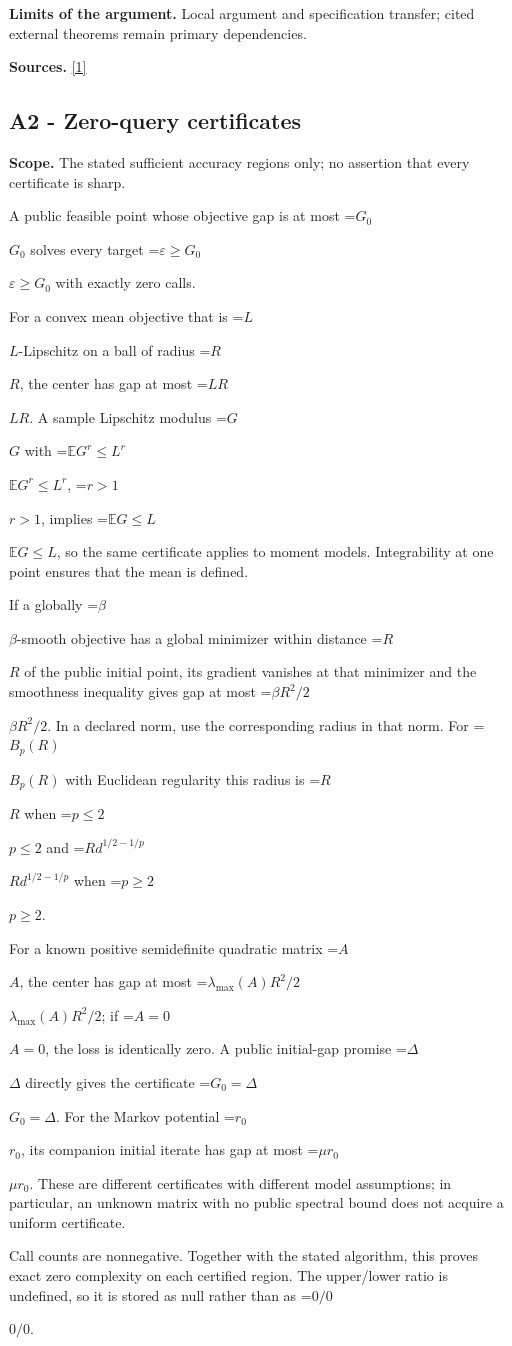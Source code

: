 \documentclass[10pt,a4paper]{article}
\newcommand{\AtlasMath}[1]{\par\begingroup\centering\setbox0=\hbox{$\displaystyle #1$}\ifdim\wd0>1.4\linewidth\typeout{ATLAS WIDE FORMULA: \the\wd0}\fi\ifdim\wd0>\linewidth\resizebox{\linewidth}{!}{\box0}\else\box0\fi\par\endgroup}
\newcommand{\AtlasInlineMath}[1]{\begingroup\setbox0=\hbox{$#1$}\ifdim\wd0>.4\linewidth\endgroup\AtlasMath{#1}\else\endgroup$#1$\fi}
\begin{document}
\textbf{Limits of the argument.} Local argument and specification transfer; cited external theorems remain primary dependencies.

\textbf{Sources.} \href{https://proceedings.mlr.press/v306/prokhorov26a.html}{[1]}

\subsection{A2 - Zero-query certificates}
\textbf{Scope.} The stated sufficient accuracy regions only; no assertion that every certificate is sharp.

A public feasible point whose objective gap is at most \AtlasInlineMath{G_0} solves every target \AtlasInlineMath{\varepsilon\ge G_0} with exactly zero calls.

For a convex mean objective that is \AtlasInlineMath{L}-Lipschitz on a ball of radius \AtlasInlineMath{R}, the center has gap at most \AtlasInlineMath{LR}. A sample Lipschitz modulus \AtlasInlineMath{G} with \AtlasInlineMath{\mathbb E G^r\le L^r}, \AtlasInlineMath{r>1}, implies \AtlasInlineMath{\mathbb E G\le L}, so the same certificate applies to moment models. Integrability at one point ensures that the mean is defined.

If a globally \AtlasInlineMath{\beta}-smooth objective has a global minimizer within distance \AtlasInlineMath{R} of the public initial point, its gradient vanishes at that minimizer and the smoothness inequality gives gap at most \AtlasInlineMath{\beta R^2/2}. In a declared norm, use the corresponding radius in that norm. For \AtlasInlineMath{B_p(R)} with Euclidean regularity this radius is \AtlasInlineMath{R} when \AtlasInlineMath{p\le2} and \AtlasInlineMath{R d^{1/2-1/p}} when \AtlasInlineMath{p\ge2}.

For a known positive semidefinite quadratic matrix \AtlasInlineMath{A}, the center has gap at most \AtlasInlineMath{\lambda_{\max}(A)R^2/2}; if \AtlasInlineMath{A=0}, the loss is identically zero. A public initial-gap promise \AtlasInlineMath{\Delta} directly gives the certificate \AtlasInlineMath{G_0=\Delta}. For the Markov potential \AtlasInlineMath{r_0}, its companion initial iterate has gap at most \AtlasInlineMath{\mu r_0}. These are different certificates with different model assumptions; in particular, an unknown matrix with no public spectral bound does not acquire a uniform certificate.

Call counts are nonnegative. Together with the stated algorithm, this proves exact zero complexity on each certified region. The upper/lower ratio is undefined, so it is stored as null rather than as \AtlasInlineMath{0/0}.
\end{document}
